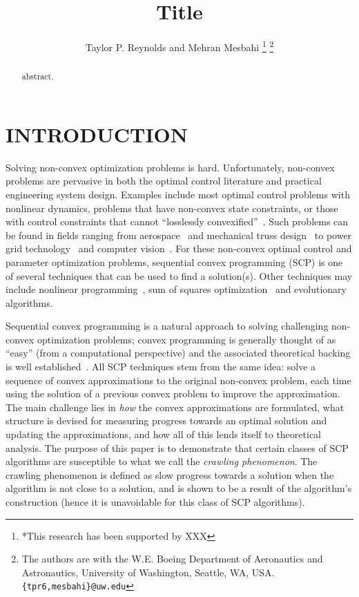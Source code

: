 \documentclass[letterpaper, 10 pt, conference]{ieeeconf}
\title{\LARGE \bf Title
}
\author{Taylor P. Reynolds and Mehran Mesbahi%
\thanks{*This research has been supported by XXX}%
\thanks{The authors are with the W.E. Boeing Department of Aeronautics and Astronautics,
        University of Washington, Seattle, WA, USA.
        {\tt\small \{tpr6,mesbahi\}@uw.edu}}%
}
\begin{document}
\maketitle
\thispagestyle{empty}
\pagestyle{empty}


\begin{abstract}

abstract.

\end{abstract}


\section{INTRODUCTION}\label{sec:intro}

Solving non-convex optimization problems is hard. Unfortunately, non-convex problems are pervasive in both the optimal control literature and practical engineering system design. Examples include most optimal control problems with nonlinear dynamics, problems that have non-convex state constraints, or those with control constraints that cannot ``losslessly convexified''~\cite{Acikmese2011,Blackmore2012b}. Such problems can be found in fields ranging from aerospace~\cite{SzmukReynolds2018,Lee2017,Liu2014} and mechanical truss design~\cite{Beck2010} to power grid technology~\cite{Wei2017} and computer vision~\cite{Jiang2007}. For these non-convex optimal control and parameter optimization problems, sequential convex programming (SCP) is one of several techniques that can be used to find a solution(s). Other techniques may include nonlinear programming~\cite{Gill1981,NocedalWright}, sum of squares optimization~\cite{Parrilo2003,Blekherman2012} and evolutionary algorithms.

Sequential convex programming is a natural approach to solving challenging non-convex optimization problems; convex programming is generally thought of as ``easy'' (from a computational perspective) and the associated theoretical backing is well established~\cite{Rockafellar1970,BoydBook}. All SCP techniques stem from the same idea: solve a sequence of convex approximations to the original non-convex problem, each time using the solution of a previous convex problem to improve the approximation.  The main challenge lies in \textit{how} the convex approximations are formulated, what structure is devised for measuring progress towards an optimal solution and updating the approximations, and how all of this lends itself to theoretical analysis. The purpose of this paper is to demonstrate that certain classes of SCP algorithms are susceptible to what we call the \textit{crawling phenomenon}. The crawling phenomenon is defined as slow progress towards a solution when the algorithm is not close to a solution, and is shown to be a result of the algorithm's construction (hence it is unavoidable for this class of SCP algorithms).
\end{document}
